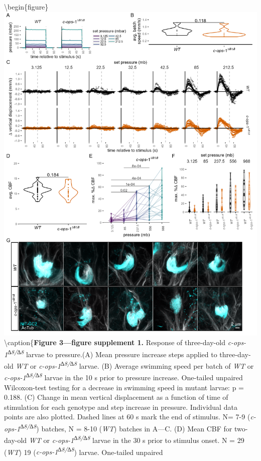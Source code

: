 \documentclass[
]{article}
\begin{document}
\textbackslash begin\{figure\}
\includegraphics[width=34.72in]{Figures/Figure3-FigureSupplement1}
\textbackslash caption\{\textbf{Figure 3---figure supplement 1. }
Response of three-day-old \emph{c-ops-1\textsuperscript{∆8/∆8}} larvae
to pressure.(A) Mean pressure increase steps applied to three-day-old
\emph{WT} or \emph{c-ops-1\textsuperscript{∆8/∆8}} larvae. (B) Average
swimming speed per batch of \emph{WT} or
\emph{c-ops-1\textsuperscript{∆8/∆8}} larvae in the 10 s prior to
pressure increase. One-tailed unpaired Wilcoxon-test testing for a
decrease in swimming speed in mutant larvae: p = 0.188. (C) Change in
mean vertical displacement as a function of time of stimulation for each
genotype and step increase in pressure. Individual data points are also
plotted. Dashed lines at 60 s mark the end of stimulus. N= 7-9
(\emph{c-ops-1\textsuperscript{∆8/∆8}}) batches, N = 8-10 (\emph{WT})
batches in A---C. (D) Mean CBF for two-day-old \emph{WT} or
\emph{c-ops-1\textsuperscript{∆8/∆8}} larvae in the 30 s prior to
stimulus onset. N = 29 (\emph{WT}) 19
(\emph{c-ops-1\textsuperscript{∆8/∆8}}) larvae. One-tailed unpaired
\end{document}
